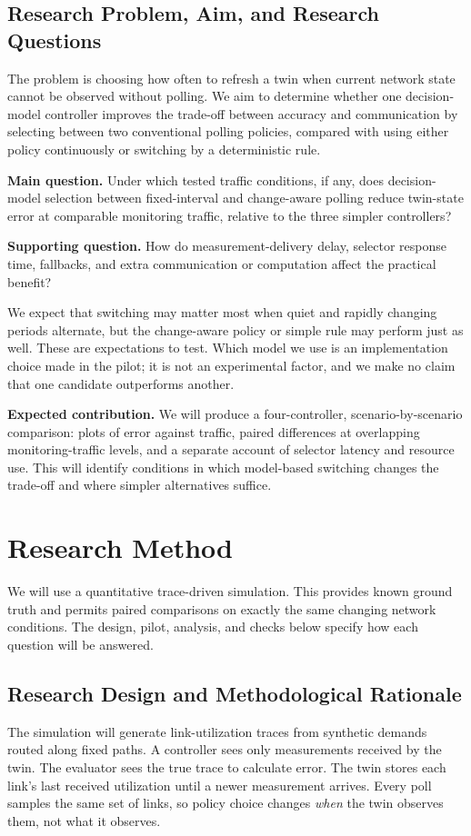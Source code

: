 \documentclass[11pt,a4paper]{article}
\begin{document}
\subsection{Research Problem, Aim, and Research Questions}
The problem is choosing how often to refresh a twin when current network state cannot be observed without polling. We aim to determine whether one decision-model controller improves the trade-off between accuracy and communication by selecting between two conventional polling policies, compared with using either policy continuously or switching by a deterministic rule.

\textbf{Main question.} Under which tested traffic conditions, if any, does decision-model selection between fixed-interval and change-aware polling reduce twin-state error at comparable monitoring traffic, relative to the three simpler controllers?

\textbf{Supporting question.} How do measurement-delivery delay, selector response time, fallbacks, and extra communication or computation affect the practical benefit?

We expect that switching may matter most when quiet and rapidly changing periods alternate, but the change-aware policy or simple rule may perform just as well. These are expectations to test. Which model we use is an implementation choice made in the pilot; it is not an experimental factor, and we make no claim that one candidate outperforms another.

\textbf{Expected contribution.} We will produce a four-controller, scenario-by-scenario comparison: plots of error against traffic, paired differences at overlapping monitoring-traffic levels, and a separate account of selector latency and resource use. This will identify conditions in which model-based switching changes the trade-off and where simpler alternatives suffice.

\section{Research Method}
We will use a quantitative trace-driven simulation. This provides known ground truth and permits paired comparisons on exactly the same changing network conditions. The design, pilot, analysis, and checks below specify how each question will be answered.

\subsection{Research Design and Methodological Rationale}
The simulation will generate link-utilization traces from synthetic demands routed along fixed paths. A controller sees only measurements received by the twin. The evaluator sees the true trace to calculate error. The twin stores each link's last received utilization until a newer measurement arrives. Every poll samples the same set of links, so policy choice changes \emph{when} the twin observes them, not what it observes.
\end{document}
